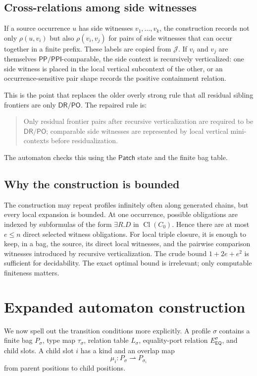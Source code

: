 \documentclass[11pt]{article}
\newcommand{\EQ}{\mathsf{EQ}}
\newcommand{\PP}{\mathsf{PP}}
\newcommand{\PPI}{\mathsf{PPI}}
\newcommand{\PO}{\mathsf{PO}}
\newcommand{\DR}{\mathsf{DR}}
\newcommand{\Cl}{\operatorname{Cl}}
\begin{document}
\subsection{Cross-relations among side witnesses}

If a source occurrence $u$ has side witnesses $v_1,\ldots,v_k$, the construction records not only $\rho(u,v_i)$ but also $\rho(v_i,v_j)$ for pairs of side witnesses that can occur together in a finite prefix.  These labels are copied from $\mathcal J$.  If $v_i$ and $v_j$ are themselves $\PP/\PPI$-comparable, the side context is recursively verticalized: one side witness is placed in the local vertical subcontext of the other, or an occurrence-sensitive pair shape records the positive containment relation.

This is the point that replaces the older overly strong rule that all residual sibling frontiers are only $\DR/\PO$.  The repaired rule is:
\begin{quote}
Only residual frontier pairs after recursive verticalization are required to be $\DR/\PO$; comparable side witnesses are represented by local vertical mini-contexts before residualization.
\end{quote}
The automaton checks this using the $\mathsf{Patch}$ state and the finite bag table.

\subsection{Why the construction is bounded}

The construction may repeat profiles infinitely often along generated chains, but every local expansion is bounded.  At one occurrence, possible obligations are indexed by subformulas of the form $\exists R.D$ in $\Cl(C_0)$.  Hence there are at most $e\le n$ direct selected witness obligations.  For local triple closure, it is enough to keep, in a bag, the source, its direct local witnesses, and the pairwise comparison witnesses introduced by recursive verticalization.  The crude bound $1+2e+e^2$ is sufficient for decidability.  The exact optimal bound is irrelevant; only computable finiteness matters.

\section{Expanded automaton construction}

We now spell out the transition conditions more explicitly.  A profile $\sigma$ contains a finite bag $P_\sigma$, type map $\tau_\sigma$, relation table $L_\sigma$, equality-port relation $E^\sigma_{\EQ}$, and child slots.  A child slot $i$ has a kind and an overlap map
\[
  \mu_i:P_\sigma\rightharpoonup P_{\sigma_i}
\]
from parent positions to child positions.
\end{document}
